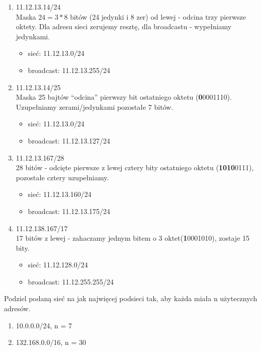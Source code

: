 \documentclass[main.tex]{subfiles}
\begin{document}
    \begin{enumerate}
        \item 11.12.13.14/24\\
        Maska $24 = 3*8$ bitów (24 jedynki i 8 zer) od lewej - odcina trzy pierwsze oktety. Dla adresu sieci zerujemy
        resztę, dla broadcastu - wypełniamy jedynkami.
        \begin{itemize}
            \item sieć: 11.12.13.0/24
            \item broadcast: 11.12.13.255/24
        \end{itemize}
        \item 11.12.13.14/25\\
        Maska 25 bajtów ``odcina'' pierwszy bit ostatniego oktetu (\textbf{0}0001110).
        Uzupełniamy zerami/jedynkami pozostałe 7 bitów.
        \begin{itemize}
            \item sieć: 11.12.13.0/24
            \item broadcast: 11.12.13.127/24
        \end{itemize}
        \item 11.12.13.167/28\\
        28 bitów - odcięte pierwsze z lewej cztery bity ostatniego oktetu (\textbf{1010}0111), pozostałe cztery uzupełniamy.
        \begin{itemize}
            \item sieć: 11.12.13.160/24
            \item broadcast: 11.12.13.175/24
        \end{itemize}
        \item 11.12.138.167/17\\
        17 bitów z lewej - zahaczamy jednym bitem o 3 oktet(\textbf{1}0001010), zostaje 15 bity.
        \begin{itemize}
            \item sieć: 11.12.128.0/24
            \item broadcast: 11.12.255.255/24
        \end{itemize}
    \end{enumerate}

    \begin{exercise}
        Podziel podaną sieć na jak najwięcej podsieci tak, aby każda miała n użytecznych adresów.
        \begin{enumerate}
            \item 10.0.0.0/24, n = 7
            \item 132.168.0.0/16, n = 30
        \end{enumerate}
    \end{exercise}
\end{document}
